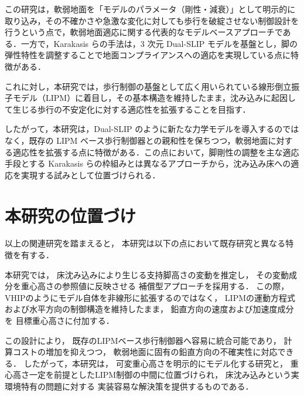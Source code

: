 この研究は，軟弱地面を「モデルのパラメータ（剛性・減衰）」として明示的に取り込み，その不確かさや急激な変化に対しても歩行を破綻させない制御設計を行うという点で，軟弱地面適応に関する代表的なモデルベースアプローチである．一方で，Karakasis らの手法は，3 次元 Dual-SLIP モデルを基盤とし，脚の弾性特性を調整することで地面コンプライアンスへの適応を実現している点に特徴がある．

これに対し，本研究では，歩行制御の基盤として広く用いられている線形倒立振子モデル（LIPM）に着目し，その基本構造を維持したまま，沈み込みに起因して生じる歩行の不安定化に対する適応性を拡張することを目指す．

したがって，本研究は，Dual-SLIP のように新たな力学モデルを導入するのではなく，既存の LIPM ベース歩行制御器との親和性を保ちつつ，軟弱地面に対する適応性を拡張する点に特徴がある．この点において，脚剛性の調整を主な適応手段とする Karakasis らの枠組みとは異なるアプローチから，沈み込み床への適応を実現する試みとして位置づけられる．

\section{本研究の位置づけ}

以上の関連研究を踏まえると，
本研究は以下の点において既存研究と異なる特徴を有する．

本研究では，
床沈み込みにより生じる支持脚高さの変動を推定し，
その変動成分を重心高さの参照値に反映させる
補償型アプローチを採用する．
この際，VHIPのようにモデル自体を非線形に拡張するのではなく，
LIPMの運動方程式および水平方向の制御構造を維持したまま，
鉛直方向の速度および加速度成分を
目標重心高さに付加する．

この設計により，
既存のLIPMベース歩行制御器へ容易に統合可能であり，
計算コストの増加を抑えつつ，
軟弱地面に固有の鉛直方向の不確実性に対応できる．
したがって，本研究は，
可変重心高さを明示的にモデル化する研究と，
重心高さ一定を前提としたLIPM制御の中間に位置づけられ，
床沈み込みという実環境特有の問題に対する
実装容易な解決策を提供するものである．

